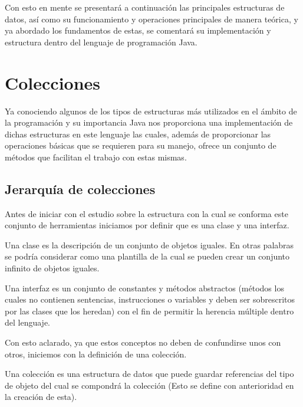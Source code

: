 \documentclass[12pt,a4paper]{report}
\begin{document}
{Con esto en mente se presentará a continuación las principales estructuras de datos, así como su funcionamiento y operaciones principales de manera teórica, y ya abordado los fundamentos de estas, se comentará su implementación y estructura dentro del lenguaje de programación Java.

\section*{Colecciones}
Ya conociendo algunos de los tipos de estructuras más utilizados en el ámbito de la programación y su importancia Java nos proporciona una implementación de dichas estructuras en este lenguaje las cuales, además de proporcionar las operaciones básicas que se requieren para su manejo, ofrece un conjunto de métodos que facilitan el trabajo con estas mismas. 
\subsection*{Jerarquía de colecciones}
Antes de iniciar con el estudio sobre la estructura con la cual se conforma este conjunto de herramientas iniciamos por definir que es una clase y una interfaz.

Una clase es la descripción de un conjunto de objetos iguales. En otras palabras se podría considerar como una plantilla de la cual se pueden crear un conjunto infinito de objetos iguales.

Una interfaz es un conjunto de constantes y métodos abstractos (métodos los cuales no contienen sentencias, instrucciones o variables y deben ser sobrescritos por las clases que los heredan) con el fin de permitir la herencia múltiple dentro del lenguaje.  

Con esto aclarado, ya que estos conceptos no deben de confundirse unos con otros, iniciemos con la definición de una colección.

Una colección es una estructura de datos que puede guardar referencias del tipo de objeto del cual se compondrá la colección (Esto se define con anterioridad en la creación de esta).

}
\end{document}
